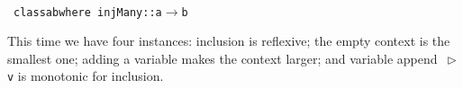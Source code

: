 \documentclass[9pt,preprint,authoryear]{sigplanconf}
\begin{document}
%
%
%
~\\~\vphantom{$\{$}\textcolor[cmyk]{0,0.65,0.99,0}{\texttt{class}}\textcolor[rgb]{0,0,0.80}{\texttt{\mbox{\hspace{0.50em}}}}\textcolor[rgb]{0,0,0.80}{\texttt{a}}\textcolor[rgb]{0,0,0.80}{\texttt{\mbox{\hspace{0.50em}}}}\textcolor[rgb]{0,0,0.80}{\texttt{\makebox[1.83ex][c]{$ \subseteq $}}}\textcolor[rgb]{0,0,0.80}{\texttt{\mbox{\hspace{0.50em}}}}\textcolor[rgb]{0,0,0.80}{\texttt{b}}\textcolor[rgb]{0,0,0.80}{\texttt{\mbox{\hspace{0.50em}}}}\textcolor[cmyk]{0,0.65,0.99,0}{\texttt{where}}\textcolor[rgb]{0,0,0.80}{\texttt{{\nopagebreak \newline%
}\vphantom{$\{$}}}\textcolor[rgb]{0,0,0.80}{\texttt{\mbox{\hspace{0.50em}}}}\textcolor[rgb]{0,0,0.80}{\texttt{\mbox{\hspace{0.50em}}}}\textcolor[rgb]{0,0,0.80}{\texttt{injMany}}\textcolor[rgb]{0,0,0.80}{\texttt{\mbox{\hspace{0.50em}}}}\textcolor[cmyk]{0,0.65,0.99,0}{\texttt{{:}{:}}}\textcolor[rgb]{0,0,0.80}{\texttt{\mbox{\hspace{0.50em}}}}\textcolor[rgb]{0,0,0.80}{\texttt{a}}\textcolor[rgb]{0,0,0.80}{\texttt{\mbox{\hspace{0.50em}}}}\textcolor[cmyk]{0,0.65,0.99,0}{\texttt{$ \rightarrow $}}\textcolor[rgb]{0,0,0.80}{\texttt{\mbox{\hspace{0.50em}}}}\textcolor[rgb]{0,0,0.80}{\texttt{b}}\textcolor[rgb]{0,0,0.80}{\texttt{{\nopagebreak \newline%
}\vphantom{$\{$}}}%


%
This time we have four instances{:} inclusion is reflexive; the empty
    context is the smallest one; adding a variable makes the context
    larger; and variable append{~}\textcolor[cmyk]{0,0.65,0.99,0}{\texttt{\makebox[1.22ex][l]{$ {(} $}}}\textcolor[rgb]{0,0,0.80}{\texttt{$ \vartriangleright $}}\textcolor[rgb]{0,0,0.80}{\texttt{\mbox{\hspace{0.50em}}}}\textcolor[rgb]{0,0,0.80}{\texttt{v}}\textcolor[cmyk]{0,0.65,0.99,0}{\texttt{\makebox[1.22ex][r]{$ {)} $}}} is monotonic for inclusion.%


{\nopagebreak }
\end{document}
